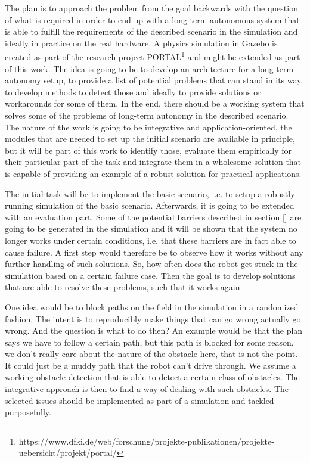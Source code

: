 \documentclass[german, master, expose, latin1]{base/thesis_KBS}
\begin{document}
The plan is to approach the problem from the goal backwards with the question of what is required in order to end up with a long-term autonomous system that is
able to fulfill the requirements of the described scenario in the simulation and ideally in practice on the real hardware.
A physics simulation in Gazebo is created as part of the research project PORTAL\footnote{https://www.dfki.de/web/forschung/projekte-publikationen/projekte-uebersicht/projekt/portal/}
and might be extended as part of this work. The idea is going to be to develop an architecture for a long-term autonomy setup, to provide a list of potential problems
that can stand in its way, to develop methods to detect those and ideally to provide solutions or workarounds for some of them.
In the end, there should be a working system that solves some of the problems of long-term autonomy in the described scenario.
The nature of the work is going to be integrative and application-oriented, the modules that are needed to set up the initial scenario are available in principle, 
but it will be part of this work to identify those, evaluate them empirically for their particular part of the task and integrate them in a wholesome solution
that is capable of providing an example of a robust solution for practical applications.\newline

The initial task will be to implement the basic scenario, i.e. to setup a robustly running simulation of the basic scenario.
Afterwards, it is going to be extended with an evaluation part. Some of the potential barriers described in section \ref{} are going to be generated
in the simulation and it will be shown that the system no longer works under certain conditions, i.e. that these barriers are in fact able to cause failure.
A first step would therefore be to observe how it works without any further handling of such solutions. So, how often does the robot get stuck in the simulation 
based on a certain failure case. Then the goal is to develop solutions that are able to resolve these problems, such that it works again.\newline

One idea would be to block paths on the field in the simulation in a randomized fashion. The intent is to reproducibly make things that can go wrong actually go wrong.
And the question is what to do then? An example would be that the plan says we have to follow a certain path, but this path is blocked for some reason, we don't really
care about the nature of the obstacle here, that is not the point. It could just be a muddy path that the robot can't drive through. We assume a working obstacle detection
that is able to detect a certain class of obstacles. The integrative approach is then to find a way of dealing with such obstacles.
The selected issues should be implemented as part of a simulation and tackled purposefully.\newline
\end{document}

